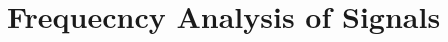 \documentclass[../course]{subfiles}
\begin{document}
\ifSubfilesClassLoaded {
    
} {
    \chapter{Frequecncy Analysis of Signals} \label{chp:wrkFrequencyAnalysis}
}




\end{document}

